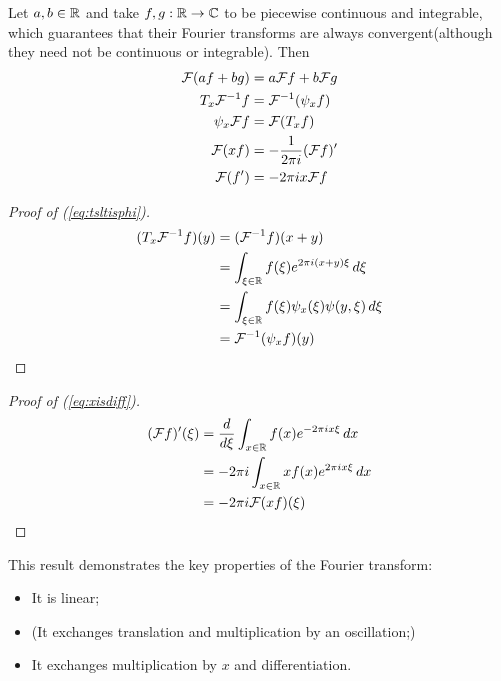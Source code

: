       \begin{lemma}
        \label{lemma:fourprops}
        Let $a,b\in\mathbb{R}$ and take $f,g:\mathbb{R}\rightarrow\mathbb{C}$ to be piecewise continuous and integrable, which guarantees that their Fourier transforms are always convergent\footnotemark (although they need not be continuous or integrable). 
        Then
        \begin{align}
          \mathcal{F}(af + bg) &= a\mathcal{F} f + b\mathcal{F} g\\
          \label{eq:tsltisphi}
            T_x\mathcal{F}^{-1}f &= \mathcal{F}^{-1}(\psi_xf)\\
          \psi_x\mathcal{F} f &= \mathcal{F}(T_xf)\\
          \label{eq:xisdiff}
            \mathcal{F}(xf) &= -\frac{1}{2\pi i}(\mathcal{F} f)'\\
          \label{eq:xisdiff2}
            \mathcal{F}(f') &= -2\pi ix\mathcal{F} f
        \end{align}
        \begin{proof}[Proof of (\ref{eq:tsltisphi})]
          \begin{align*}
            (T_x\mathcal{F}^{-1}f)(y) &= (\mathcal{F}^{-1}f)(x+y)\\
            &= \int_{\xi\in\mathbb{R}}f(\xi)e^{2\pi i(x+y)\xi}\,d\xi\\
            &= \int_{\xi\in\mathbb{R}}f(\xi)\psi_x(\xi)\psi(y,\xi)\,d\xi\\
            &= \mathcal{F}^{-1}(\psi_xf)(y)\qedhere
          \end{align*}
        \end{proof}
        \begin{proof}[Proof of (\ref{eq:xisdiff})]
          \begin{align*}
            (\mathcal{F} f)'(\xi) &= \frac{d}{d\xi}\int_{x\in\mathbb{R}} f(x)e^{-2\pi i x\xi}\,dx\\
            &= -2\pi i \int_{x\in\mathbb{R}} xf(x)e^{2\pi i x\xi}\,dx\\
            &= -2\pi i\mathcal{F}(xf)(\xi)\qedhere
          \end{align*}
        \end{proof}
      \end{lemma}
      This result demonstrates the key properties of the Fourier transform:
      \begin{itemize}
        \item It is linear;
        \item (It exchanges translation and multiplication by an oscillation;) 
        \item It exchanges multiplication by $x$ and differentiation.
      \end{itemize}

